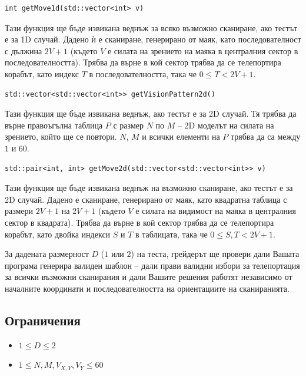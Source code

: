 \documentclass[12pt]{article}
\begin{document}
\begin{lstlisting}
int getMove1d(std::vector<int> v)
\end{lstlisting}

Тази функция ще бъде извикана веднъж за всяко възможно сканиране, ако тестът е за 1D случай. Дадено ѝ е сканиране, генерирано от маяк, като последователност с дължина $2V + 1$ (където $V$ е силата на зрението на маяка в централния сектор в последователността). Трябва да върне в кой сектор трябва да се телепортира корабът, като индекс $T$ в последователността, така че $0 \leq T < 2V + 1$.

\begin{lstlisting}
std::vector<std::vector<int>> getVisionPattern2d()
\end{lstlisting}

Тази функция ще бъде извикана веднъж, ако тестът е за 2D случай. Тя трябва да върне правоъгълна таблица $P$ с размер $N$ по $M$ -- 2D моделът на силата на зрението, който ще се повтори. $N$, $M$ и всички елементи на $P$ трябва да са между $1$ и $60$.

\begin{lstlisting}
std::pair<int, int> getMove2d(std::vector<std::vector<int>> v)
\end{lstlisting}

Тази функция ще бъде извикана веднъж на възможно сканиране, ако тестът е за 2D случай. Дадено е сканиране, генерирано от маяк, като квадратна таблица с размери $2V + 1$ на $2V + 1$ (където $V$ е силата на видимост на маяка в централния сектор в квадрата). Трябва да върне в кой сектор трябва да се телепортира корабът, като двойка индекси $S$ и $T$ в таблицата, така че $0 \leq S, T < 2V + 1$.

За дадената размерност $D$ ($1$ или $2$) на теста, грейдерът ще провери дали Вашата програма генерира валиден шаблон -- дали прави валидни избори за телепортация за всички възможни сканирания и дали Вашите решения работят независимо от началните координати и последователността на ориентациите на сканиранията.

\subsection{Ограничения}

\vspace{0.1em}

\begin{itemize}
\item $1 \leq D \leq 2$
\item $1 \leq N, M, V_{X, Y}, V_Y \leq 60$
\end{itemize}
\end{document}

